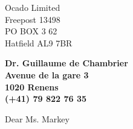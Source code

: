 \documentclass[11pt]{letter} %
\begin{document}

\begin{letter}{Ocado Limited\\ Freepost 13498\\ PO BOX 3 62\\ Hatfield AL9 7BR} 


\begin{center}
\large\bf Dr. Guillaume de Chambrier \\ %
Avenue de la gare 3 \\ 1020 Renens \\ (+41) 79 822 76 35 %
\end{center} 
\vfill

\signature{Guillaume de Chambrier} %


\opening{Dear Ms. Markey} 








\end{letter}
\end{document}
